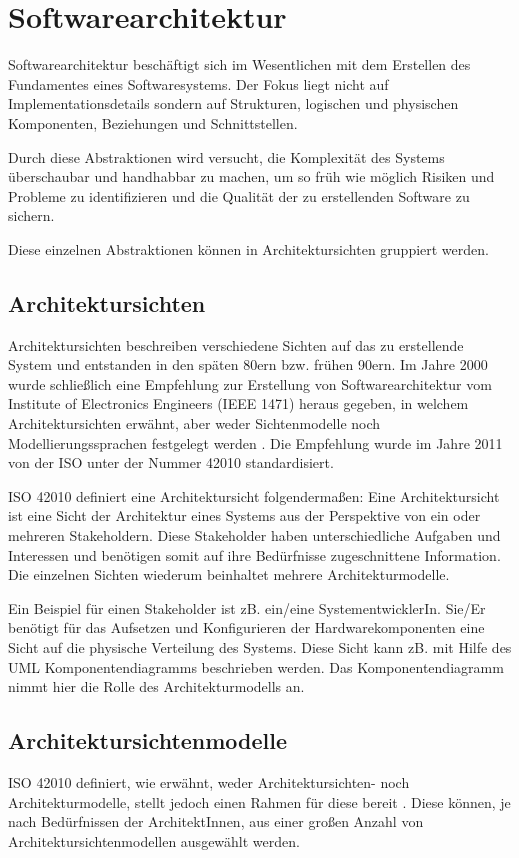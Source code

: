 \chapter{Softwarearchitektur}
Softwarearchitektur beschäftigt sich im Wesentlichen mit dem Erstellen des Fundamentes eines Softwaresystems. Der Fokus liegt nicht auf Implementationsdetails sondern auf Strukturen, logischen und physischen Komponenten, Beziehungen und Schnittstellen. \cite[S. 9-10]{softarch}

Durch diese Abstraktionen wird versucht, die Komplexität des Systems \glqq überschaubar und handhabbar\grqq \cite[S. 10]{softarch} zu machen, um so früh wie möglich Risiken und Probleme zu identifizieren und die Qualität der zu erstellenden Software zu sichern. \cite[S. 10]{softarch}

Diese einzelnen Abstraktionen können in Architektursichten gruppiert werden.

\section{Architektursichten}
Architektursichten beschreiben verschiedene Sichten auf das zu erstellende System und entstanden in den späten 80ern bzw. frühen 90ern. Im Jahre 2000 wurde schließlich eine Empfehlung zur Erstellung von Softwarearchitektur vom Institute of Electronics Engineers (IEEE 1471) heraus gegeben, in welchem Architektursichten erwähnt, aber weder Sichtenmodelle noch Modellierungssprachen festgelegt werden \cite{ISO_ARCH_OLD}\cite[S. 138]{basiswissen}. Die Empfehlung wurde im Jahre 2011 von der ISO unter der Nummer 42010 standardisiert\cite{ISO_ARCH}.

ISO 42010 definiert eine Architektursicht folgendermaßen: Eine Architektursicht ist eine Sicht der Architektur eines Systems aus der Perspektive von ein oder mehreren Stakeholdern. Diese Stakeholder haben unterschiedliche Aufgaben und Interessen und benötigen somit auf ihre Bedürfnisse zugeschnittene Information. Die einzelnen Sichten wiederum beinhaltet mehrere Architekturmodelle. \cite{ISO_ARCH}

Ein Beispiel für einen Stakeholder ist zB. ein/eine SystementwicklerIn. Sie/Er benötigt für das Aufsetzen und Konfigurieren der Hardwarekomponenten eine Sicht auf die physische Verteilung des Systems. Diese Sicht kann zB. mit Hilfe des UML Komponentendiagramms beschrieben werden. Das Komponentendiagramm nimmt hier die Rolle des Architekturmodells an.

\section{Architektursichtenmodelle}
ISO 42010 definiert, wie erwähnt, weder Architektursichten- noch Architekturmodelle, stellt jedoch einen Rahmen für diese bereit
\cite[S. 138]{basiswissen}. Diese können, je nach Bedürfnissen der ArchitektInnen, aus einer großen Anzahl von Architektursichtenmodellen ausgewählt werden. \cite[S. 142-145]{basiswissen}

